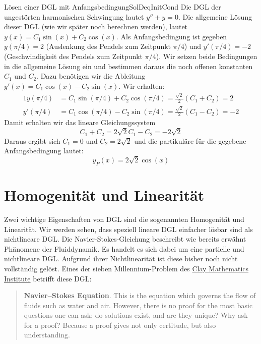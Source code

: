 \begin{example}{Lösen einer DGL mit Anfangsbedingung}{SolDeqInitCond}
    Die DGL der ungestörten harmonischen Schwingung lautet $y''+y=0$. Die allgemeine Lösung dieser DGL (wie wir später noch berechnen werden), lautet $y(x) = C_1 \sin(x) + C_2 \cos(x)$. Als Anfangsbedingung ist gegeben $y(\pi/4)=2$ (Auslenkung des Pendels zum Zeitpunkt $\pi/4$) und $y'(\pi/4)=-2$ (Geschwindigkeit des Pendels zum Zeitpunkt $\pi/4$). Wir setzen beide Bedingungen in die allgemeine Lösung ein und bestimmen daraus die noch offenen konstanten $C_1$ und $C_2$. Dazu benötigen wir die Ableitung $y'(x) = C_1\cos(x) - C_2\sin(x)$. Wir erhalten:
    \begin{alignat*}{1}
        y(\pi/4) &= C_1 \sin(\pi/4) + C_2\cos(\pi/4) = \frac{\sqrt{2}}{2} (C_1+C_2) = 2 \\
        y'(\pi/4) &= C_1 \cos(\pi/4) - C_2\sin(\pi/4) = \frac{\sqrt{2}}{2} (C_1-C_2) = -2
    \end{alignat*}
    Damit erhalten wir das lineare Gleichungssystem
    $$
        C_1+C_2=2\sqrt{2}
        C_1-C_2=-2\sqrt{2}
    $$
    Daraus ergibt sich $C_1=0$ und $C_2=2\sqrt{2}$ und die partikuläre für die gegebene Anfangsbedingung lautet:
    $$
        y_P(x) = 2\sqrt{2}\cos(x)
    $$
\end{example}

\section{Homogenität und Linearität}

Zwei wichtige Eigenschaften von DGL sind die sogenannten Homogenität und Linearität. Wir werden sehen, dass speziell lineare DGL einfacher lösbar sind als nichtlineare DGL. Die Navier-Stokes-Gleichung beschreibt wie bereits erwähnt Phänomene der Fluiddynamik. Es handelt es sich dabei um eine partielle und nichtlineare DGL. Aufgrund ihrer Nichtlinearität ist diese bisher noch nicht vollständig gelöst. Eines der sieben Millennium-Problem des \href{http://www.claymath.org/millennium-problems}{Clay Mathematics Institute} betrifft diese DGL:

\begin{quotation}
    \textbf{Navier–Stokes Equation}. This is the equation which governs the flow of fluids such as water and air. However, there is no proof for the most basic questions one can ask: do solutions exist, and are they unique? Why ask for a proof? Because a proof gives not only certitude, but also understanding.
\end{quotation}


